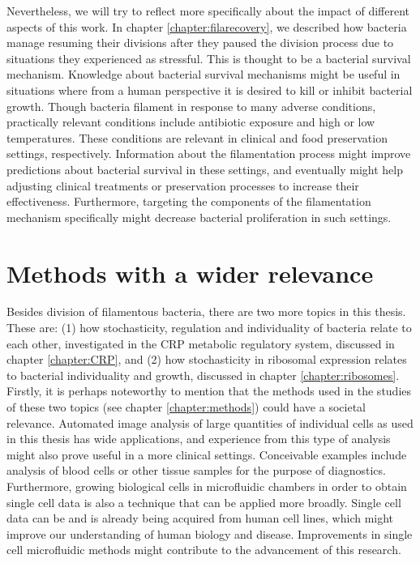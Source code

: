 Nevertheless, we will try to reflect more specifically about the impact of different aspects of this work.
%
In chapter \ref{chapter:filarecovery}, we described how bacteria manage resuming their divisions after they 
paused the division process due to situations they experienced as stressful.
%
This is thought to be a bacterial survival mechanism.
%
Knowledge about bacterial survival mechanisms might be useful in situations 
where from a human perspective it is desired to kill or inhibit bacterial growth.
%
Though bacteria filament in response to many adverse conditions, 
practically relevant conditions include antibiotic exposure and high or low temperatures.
%
These conditions are relevant in clinical and food preservation settings, respectively.
%
Information about the filamentation process might improve predictions about bacterial survival in these settings,
and eventually might help adjusting clinical treatments or preservation processes to increase their effectiveness.
%
Furthermore, targeting the components of the filamentation mechanism specifically might 
decrease bacterial proliferation in %
such settings.

\section{Methods with a wider relevance}

Besides 
division of filamentous bacteria, there are two more topics in this thesis.
These are: 
(1) how stochasticity, regulation and individuality of bacteria relate to each other, investigated in the CRP metabolic regulatory system, discussed in chapter \ref{chapter:CRP},
and (2) how stochasticity in ribosomal expression relates to bacterial individuality and growth, discussed in chapter \ref{chapter:ribosomes}.
%
%
Firstly, 
it is perhaps noteworthy to mention that the methods used in the studies of these two topics (see chapter \ref{chapter:methods})
could have a societal relevance. 
%
Automated image analysis of large quantities of individual cells as used in this thesis has wide applications, %
and experience from this type of analysis might also prove useful in a more clinical settings.
%
Conceivable examples include analysis of blood cells or other tissue samples for the purpose of diagnostics.
%
Furthermore, growing biological cells in microfluidic chambers in order to obtain single cell data is also a technique that can be applied more broadly.
%
Single cell data can be and is already being acquired from human cell lines, 
which might improve our understanding of human biology and disease.
%
Improvements in single cell microfluidic methods might contribute to the advancement of this research.

